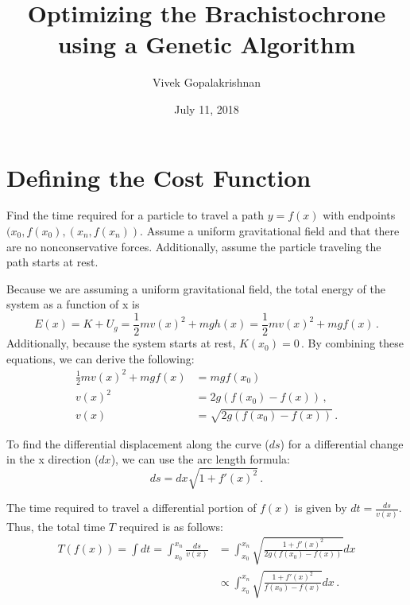 \documentclass{article}
\title{Optimizing the Brachistochrone using a Genetic Algorithm}
\author{Vivek Gopalakrishnan}
\date{July 11, 2018}
\begin{document}
\maketitle

\section{Defining the Cost Function}
Find the time required for a particle to travel a path $y=f(x)$ with endpoints $(x_0,f(x_0), (x_n, f(x_n))$. Assume a uniform gravitational field and that there are no nonconservative forces. Additionally, assume the particle traveling the path starts at rest.

Because we are assuming a uniform gravitational field, the total energy of the system as a function of x is
\begin{equation}
	E(x) = K + U_g = \frac{1}{2}mv(x)^2 + mgh(x) = \frac{1}{2}mv(x)^2 + mgf(x) \,.
\end{equation}
Additionally, because the system starts at rest, $K(x_0)=0 \,.$
\noindent
By combining these equations, we can derive the following:
\begin{equation}
	\begin{split}
		\frac{1}{2}mv(x)^2 + mgf(x) &= mgf(x_0) \\
		v(x)^2 &= 2g(f(x_0) - f(x)) \,, \\
		v(x) &= \sqrt{2g(f(x_0) - f(x))} \,.
	\end{split}
\end{equation}

\noindent
To find the differential displacement along the curve ($ds$) for a differential change in the x direction ($dx$), we can use the arc length formula:
\begin{equation}
	ds = dx \sqrt{1 + f'(x)^2} \,.
\end{equation}

The time required to travel a differential portion of $f(x)$ is given by $dt = \frac{ds}{v(x)}$. Thus, the total time $T$ required is as follows:
\begin{equation}
	\begin{split}
    		T(f(x)) = \int{dt} = \int_{x_0}^{x_n} \frac{ds}{v(x)} 
    					&= \int_{x_0}^{x_n} \sqrt{\frac{1 + f'(x)^2}{2g(f(x_0) - f(x))}}dx \\
    				        &\propto \int_{x_0}^{x_n} \sqrt{\frac{1 + f'(x)^2}{f(x_0) - f(x)}}dx \,.
	\end{split}
\end{equation}
\end{document}
